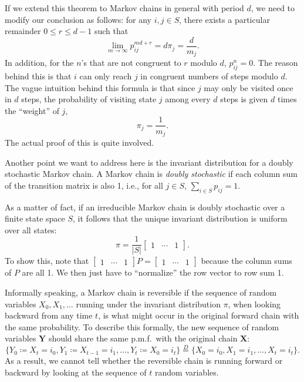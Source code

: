 \documentclass[11pt]{article}
\newcommand{\abs}[1]{\lvert #1 \rvert}
\begin{document}
If we extend this theorem to Markov chains in general with period $d$, we need to modify our conclusion as follows: for any $i,j\in S$, there exists a particular remainder 
$0\leq r\leq d- 1$ such that
\[
\lim _{m\rightarrow \infty }p_{ij}^{md+r}=d\pi _{j}=\frac{d}{m_{j}}.
\]
In addition, for the $n$’s that are not congruent to $r$ modulo $d$, $p_{ij}^{n}=0$. The reason behind this is that $i$ can only reach $j$ in congruent numbers of steps modulo $d$. The vague intuition behind this formula is that since $j$ may only be visited once in $d$ steps, the probability of visiting state $j$ among every $d$ steps is given $d$ times the “weight” of $j$,
\[
\pi _{j}=\frac{1}{m_{j}}.
\]
The actual proof of this is quite involved.

Another point we want to address here is the invariant distribution for a doubly stochastic Markov chain. A Markov chain is \textit{doubly stochastic} if each column sum of the transition matrix is also 1, i.e., for all $j\in S$, $\sum_{i\in S}p_{ij}=1$.

As a matter of fact, if an irreducible Markov chain is doubly stochastic over a finite state space $S$, it follows that the unique invariant distribution is uniform over all states:
\[
\pi =\frac{1}{\abs{S}}
\begin{bmatrix}
    1 & \cdots & 1
\end{bmatrix}.
\]
To show this, note that $ \begin{bmatrix}
    1 & \cdots & 1
\end{bmatrix} P = \begin{bmatrix}
    1 & \cdots & 1
\end{bmatrix}$ because the column sums of $P$ are all 1. We then just have to “normalize” the row vector to row sum 1.

Informally speaking, a Markov chain is reversible if the sequence of random variables 
$X_{0},X_{1},\dots $ running under the invariant distribution $\pi $, when looking backward from any time $t$, is what might occur in the original forward chain with the same probability. To describe this formally, the new sequence of random variables $\mathbf{Y}$ should share the same p.m.f.\ with the original chain $\mathbf{X}$:
\[
\{Y_{0}\coloneqq X_{t}=i_{0},Y_{1}\coloneqq X_{t- 1}=i_{1},\dots ,Y_{t}\coloneqq X_{0}=i_{t}\} \overset{D}{=} \{X_{0}=i_{0},X_{1}=i_{1},\dots ,X_{t}=i_{t}\}.
\]
As a result, we cannot tell whether the reversible chain is running forward or backward by looking at the sequence of $t$ random variables.
\end{document}
